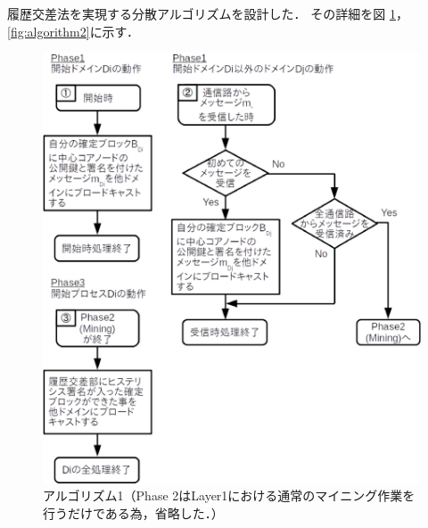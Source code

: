 \documentclass[a4paper,12pt]{jsarticle}
\begin{document}
履歴交差法を実現する分散アルゴリズム\cite{manabe}を設計した．
その詳細を図 \ref{fig:algorithm1}，\ref{fig:algorithm2}に示す．
%
\begin{figure}[tbh]
  \begin{center}
    \includegraphics{pht/flow_chart-algorithm1.eps}
  \end{center}
  \caption{アルゴリズム1（Phase 2はLayer1における通常のマイニング作業を行うだけである為，省略した．）}
  \label{fig:algorithm1}
\end{figure}
%
%
\end{document}
